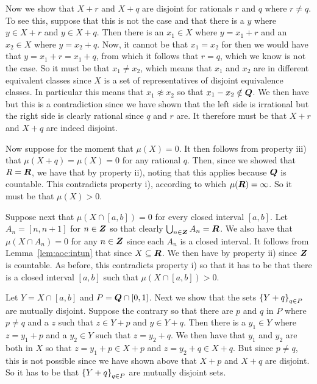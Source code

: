 \begin{questions}
{{    Now we show that $X + r$ and $X + q$ are disjoint for rationals $r$ and $q$ where $r \neq q$.
    To see this, suppose that this is not the case and that there is a $y$ where $y \in X + r$ and $y \in X + q$.
    Then there is an $x_1 \in X$ where $y = x_1 + r$ and an $x_2 \in X$ where $y = x_2 + q$.
    Now, it cannot be that $x_1 = x_2$ for then we would have that $y = x_1 + r = x_1 + q$, from which it follows that $r = q$, which we know is not the case.
    So it must be that $x_1 \neq x_2$, which means that $x_1$ and $x_2$ are in different equivalent classes since $X$ is a set of representatives of disjoint equivalence classes.
    In particular this means that $x_1 \not \approx x_2$ so that $x_1 - x_2 \notin {\boldsymbol{Q}}$.
    We then have
    but this is a contradiction since we have shown that the left side is irrational but the right side is clearly rational since $q$ and $r$ are.
    It therefore must be that $X + r$ and $X + q$ are indeed disjoint.

    Now suppose for the moment that $\mu(X) = 0$.
    It then follows from property iii) that $\mu(X + q) = \mu(X) = 0$ for any rational $q$.
    Then, since we showed that $R = {\boldsymbol{R}}$, we have that
    by property ii), noting that this applies because ${\boldsymbol{Q}}$ is countable.
    This contradicts property i), according to which $\mu({\boldsymbol{R}}) = \infty$.
    So it must be that $\mu(X) > 0$.

    Suppose next that $\mu(X \cap [a, b]) = 0$ for every closed interval $[a,b]$.
    Let $A_n = [n, n+1]$ for $n \in {\boldsymbol{Z}}$ so that clearly $\bigcup_{n \in {\boldsymbol{Z}}} A_n = {\boldsymbol{R}}$.
    We also have that $\mu(X \cap A_n) = 0$ for any $n \in {\boldsymbol{Z}}$ since each $A_n$ is a closed interval.
    It follows from Lemma~\ref{lem:aoc:intun} that
    since $X \subseteq {\boldsymbol{R}}$.
    We then have
    by property ii) since ${\boldsymbol{Z}}$ is countable.
    As before, this contradicts property i) so that it has to be that there is a closed interval $[a,b]$ such that $\mu(X \cap [a,b]) > 0$.

    Let $Y = X \cap [a,b]$ and $P = {\boldsymbol{Q}} \cap [0,1]$.
    Next we show that the sets $\left\{ Y + q \right\}_{q \in P}$ are mutually disjoint.
    Suppose the contrary so that there are $p$ and $q$ in $P$ where $p \neq q$ and a $z$ such that $z \in Y + p$ and $y \in Y + q$.
    Then there is a $y_1 \in Y$ where $z = y_1 + p$ and a $y_2 \in Y$ such that $z = y_2 + q$.
    We then have that $y_1$ and $y_2$ are both in $X$ so that $z = y_1 + p \in X + p$ and $z = y_2 + q \in X + q$.
    But since $p \neq q$, this is not possible since we have shown above that $X + p$ and $X + q$ are disjoint.
    So it has to be that $\left\{ Y + q \right\}_{q \in P}$ are mutually disjoint sets.

}}
\end{questions}
